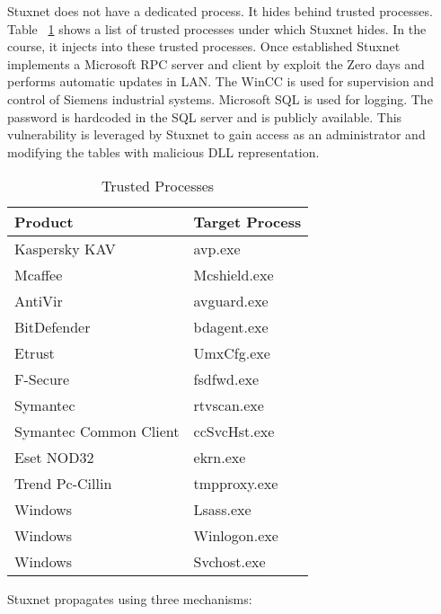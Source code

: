 \documentclass[article,msc=informatik,type=msc,colorback,accentcolor=tud9c]{tudthesis}
\begin{document}
	\vspace{3mm}
	Stuxnet does not have a dedicated process. It hides behind trusted processes. Table ~\ref{Trusted Processes} shows a list of trusted processes under which Stuxnet hides. In the course, it injects into these trusted processes. Once established Stuxnet implements a Microsoft \ac{RPC} server and client by exploit the Zero days and performs automatic updates in LAN. The \ac{WinCC} is used for supervision and control of Siemens industrial systems. Microsoft \ac{SQL} is used for logging. The password is hardcoded in the \ac{SQL} server and is publicly available. This vulnerability is leveraged by Stuxnet to gain access as an administrator and modifying the tables with malicious \ac{DLL} representation.
	
	\begin{table}[H]
	\centering
	\caption{Trusted Processes}
	\label{Trusted Processes}
	\begin{tabular}{|l|l|}
	\hline
	\textbf{Product}       & \textbf{Target Process} \\ \hline
	Kaspersky KAV          & avp.exe                 \\ \hline
	Mcaffee                & Mcshield.exe            \\ \hline
	AntiVir                & avguard.exe             \\ \hline
	BitDefender            & bdagent.exe             \\ \hline
	Etrust                 & UmxCfg.exe              \\ \hline
	F-Secure               & fsdfwd.exe              \\ \hline
	Symantec               & rtvscan.exe             \\ \hline
	Symantec Common Client & ccSvcHst.exe            \\ \hline
	Eset NOD32             & ekrn.exe                \\ \hline
	Trend Pc-Cillin        & tmpproxy.exe            \\ \hline
	Windows                & Lsass.exe               \\ \hline
	Windows                & Winlogon.exe            \\ \hline
	Windows                & Svchost.exe             \\ \hline
	\end{tabular}
	\end{table}
	
	
	Stuxnet propagates using three mechanisms:
	
\end{document}
